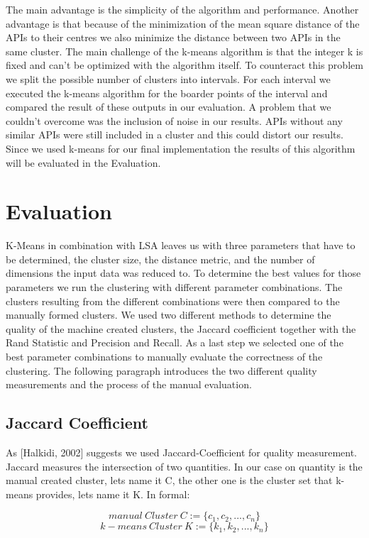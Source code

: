 \documentclass[a4paper]{IEEEtran}
\begin{document}
The main advantage is the simplicity of the algorithm and performance. Another advantage is that because of the minimization of the mean square distance of the APIs to their centres we also minimize the distance between two APIs in the same cluster.
The main challenge of the k-means algorithm is that the integer k is fixed and can’t be optimized with the algorithm itself. To counteract this problem we split the possible number of clusters into intervals. For each interval we executed the k-means algorithm for the boarder points of the interval and compared the result of these outputs in our evaluation.
A problem that we couldn’t overcome was the inclusion of noise in our results. APIs without any similar APIs were still included in a cluster and this could distort our results.
Since we used k-means for our final implementation the results of this algorithm will be evaluated in the Evaluation.


\section{Evaluation}
K-Means in combination with LSA leaves us with three parameters that have to be determined, the cluster size, the distance metric, and the number of dimensions the input data was reduced to. To determine the best values for those parameters we run the clustering with different parameter combinations. The clusters resulting from the different combinations were then compared to the manually formed clusters. We used two different methods to determine the quality of the machine created clusters, the Jaccard coefficient together with the Rand Statistic and Precision and Recall. As a last step we selected one of the best parameter combinations to manually evaluate the correctness of the clustering. The following paragraph introduces the two different quality measurements and the process of the manual evaluation.

\subsection{Jaccard Coefficient}
As [Halkidi, 2002] \cite{halkidi2002cluster}  suggests we used Jaccard-Coefficient for quality measurement. Jaccard measures the intersection of two quantities. In our case on quantity is the manual created cluster, lets name it C, the other one is the cluster set that k-means provides, lets name it K. In formal:

\begin{equation*}
manual~Cluster~C := \{ c_1,c_2,...,c_n \}
\end{equation*}
\begin{equation*}
k-means~Cluster~K := \{ k_1,k_2,...,k_n \}
\end{equation*}
\end{document}
